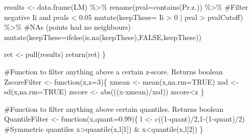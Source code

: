 \documentclass[]{elsarticle} %
\newenvironment{Shaded}{}{}
\newcommand{\AttributeTok}[1]{#1}
\newcommand{\CommentTok}[1]{\textcolor[rgb]{0.00,0.50,0.00}{#1}}
\newcommand{\ConstantTok}[1]{#1}
\newcommand{\ControlFlowTok}[1]{\textcolor[rgb]{0.00,0.00,1.00}{#1}}
\newcommand{\DecValTok}[1]{#1}
\newcommand{\FloatTok}[1]{#1}
\newcommand{\FunctionTok}[1]{#1}
\newcommand{\NormalTok}[1]{#1}
\newcommand{\OtherTok}[1]{\textcolor[rgb]{1.00,0.25,0.00}{#1}}
\newcommand{\SpecialCharTok}[1]{\textcolor[rgb]{0.00,0.50,0.50}{#1}}
\newcommand{\StringTok}[1]{\textcolor[rgb]{0.00,0.50,0.50}{#1}}
\begin{document}
\begin{Shaded}
\begin{Highlighting}[]
\NormalTok{  results }\OtherTok{\textless{}{-}} \FunctionTok{data.frame}\NormalTok{(LM) }\SpecialCharTok{\%\textgreater{}\%} 
    \FunctionTok{rename}\NormalTok{(}\StringTok{\textquotesingle{}pval\textquotesingle{}}\OtherTok{=}\FunctionTok{contains}\NormalTok{(}\StringTok{\textquotesingle{}Pr.z.\textquotesingle{}}\NormalTok{)) }\SpecialCharTok{\%\textgreater{}\%} 
    \CommentTok{\#Filter negative Ii and pvals \textless{} 0.05}
    \FunctionTok{mutate}\NormalTok{(}\AttributeTok{keepThese=}\NormalTok{ Ii }\SpecialCharTok{\textgreater{}} \DecValTok{0} \SpecialCharTok{|}\NormalTok{ pval }\SpecialCharTok{\textgreater{}}\NormalTok{ pvalCutoff) }\SpecialCharTok{\%\textgreater{}\%} 
    \CommentTok{\#NAs (points had no neighbours)}
    \FunctionTok{mutate}\NormalTok{(}\AttributeTok{keepThese=}\FunctionTok{ifelse}\NormalTok{(}\FunctionTok{is.na}\NormalTok{(keepThese),}\ConstantTok{FALSE}\NormalTok{,keepThese)) }
  
\NormalTok{  ret }\OtherTok{\textless{}{-}} \FunctionTok{pull}\NormalTok{(results)}
  \FunctionTok{return}\NormalTok{(ret)}
\NormalTok{\}}

\CommentTok{\#Function to filter anything above a certain z{-}score. Returns boolean}
\NormalTok{ZscoreFilter }\OtherTok{\textless{}{-}} \ControlFlowTok{function}\NormalTok{(x,}\AttributeTok{z=}\DecValTok{3}\NormalTok{)\{}
\NormalTok{  xmean }\OtherTok{\textless{}{-}} \FunctionTok{mean}\NormalTok{(x,}\AttributeTok{na.rm=}\ConstantTok{TRUE}\NormalTok{)}
\NormalTok{  xsd }\OtherTok{\textless{}{-}} \FunctionTok{sd}\NormalTok{(x,}\AttributeTok{na.rm=}\ConstantTok{TRUE}\NormalTok{)}
\NormalTok{  zscore }\OtherTok{\textless{}{-}} \FunctionTok{abs}\NormalTok{(((x}\SpecialCharTok{{-}}\NormalTok{xmean)}\SpecialCharTok{/}\NormalTok{xsd))}
\NormalTok{  zscore}\SpecialCharTok{\textless{}}\NormalTok{z}
\NormalTok{\} }

\CommentTok{\#Function to filter anything above certain quantiles. Returns boolean}
\NormalTok{QuantileFilter }\OtherTok{\textless{}{-}} \ControlFlowTok{function}\NormalTok{(x,}\AttributeTok{quant=}\FloatTok{0.99}\NormalTok{)\{ }
\NormalTok{  l }\OtherTok{\textless{}{-}} \FunctionTok{c}\NormalTok{((}\DecValTok{1}\SpecialCharTok{{-}}\NormalTok{quant)}\SpecialCharTok{/}\DecValTok{2}\NormalTok{,}\DecValTok{1}\SpecialCharTok{{-}}\NormalTok{(}\DecValTok{1}\SpecialCharTok{{-}}\NormalTok{quant)}\SpecialCharTok{/}\DecValTok{2}\NormalTok{) }\CommentTok{\#Symmetric quantiles}
\NormalTok{  x}\SpecialCharTok{\textgreater{}}\FunctionTok{quantile}\NormalTok{(x,l[}\DecValTok{1}\NormalTok{]) }\SpecialCharTok{\&}\NormalTok{ x}\SpecialCharTok{\textless{}}\FunctionTok{quantile}\NormalTok{(x,l[}\DecValTok{2}\NormalTok{]) }
\NormalTok{\}}


\end{Highlighting}
\end{Shaded}
\end{document}

